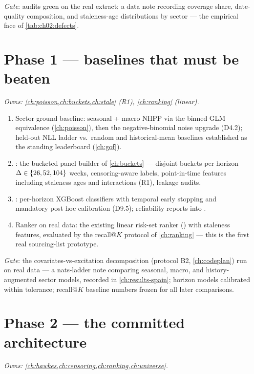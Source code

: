 \emph{Gate}: audits green on the real extract; a data note recording
coverage share, date-quality composition, and staleness-age
distributions by sector --- the empirical face of
\cref{tab:ch02:defects}.

\section{Phase 1 --- baselines that must be beaten}\label{ch13:sec:phase1}

\emph{Owns: \cref{ch:poisson,ch:buckets,ch:stale} (R1),
\cref{ch:ranking} (linear).}

\begin{enumerate}[label=P1.\arabic*,leftmargin=3.2em]
\item Sector ground baseline: seasonal + macro NHPP via the binned GLM
equivalence (\cref{ch:poisson}), then the negative-binomial noise
upgrade (D4.2); held-out NLL ladder vs.\ random and historical-mean
baselines established as the standing leaderboard (\cref{ch:gof}).
\item {}: the bucketed panel builder of \cref{ch:buckets}
--- disjoint buckets per horizon $\Delta \in \{26, 52, 104\}$ weeks,
censoring-aware labels, point-in-time features including staleness ages
and interactions (R1), leakage audits.
\item {}: per-horizon XGBoost classifiers
with temporal early stopping and mandatory post-hoc calibration
(D9.5); reliability reports into .
\item Ranker on real data: the existing linear risk-set ranker
() with staleness features, evaluated by the
recall@$K$ protocol of \cref{ch:ranking} --- this is the first real
sourcing-list prototype.
\end{enumerate}

\emph{Gate}: the covariates-vs-excitation decomposition (protocol B2,
\cref{ch:codeplan}) run on real data --- a nats-ladder note comparing
seasonal, macro, and history-augmented sector models, recorded in
\cref{ch:results-spain}; horizon models calibrated within
tolerance; recall@$K$ baseline numbers frozen for all later
comparisons.

\section{Phase 2 --- the committed architecture}\label{ch13:sec:phase2}

\emph{Owns: \cref{ch:hawkes,ch:censoring,ch:ranking,ch:universe}.}

